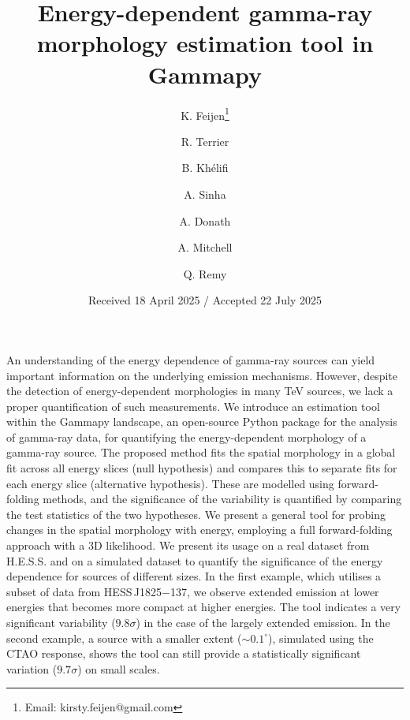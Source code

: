 \documentclass{aa}
\newcommand{\hessj}{HESS\,J1825$-$137\xspace}
\begin{document}
 

   \title{Energy-dependent gamma-ray morphology estimation tool in Gammapy}

   \author{K. Feijen\thanks{Email: kirsty.feijen@gmail.com} 
          \and R. Terrier 
          \and B. Khélifi 
          \and A. Sinha 
          \and A. Donath 
          \and A. Mitchell 
          \and Q. Remy 
          }


   \date{Received 18 April 2025 / Accepted 22 July 2025}

 
  \abstract
   {An understanding of the energy dependence of gamma-ray sources can yield important information on the underlying emission mechanisms. However, despite the detection of energy-dependent morphologies in many TeV sources, we lack a proper quantification of such measurements.}
   {We introduce an estimation tool within the Gammapy landscape, an open-source Python package for the analysis of gamma-ray data, for quantifying the energy-dependent morphology of a gamma-ray source.}
   {The proposed method  fits the spatial morphology in a global fit across all energy slices (null hypothesis) and compares this to separate fits for each energy slice (alternative hypothesis). These are modelled using forward-folding methods, and the significance of the variability is quantified by comparing the test statistics of the two hypotheses.}
   {We present a general tool for probing changes in the spatial morphology with energy, employing a full forward-folding approach with a 3D likelihood. We present its usage on a real dataset from H.E.S.S. and on a simulated dataset to quantify the significance of the energy dependence for sources of different sizes. In the first example, which utilises a subset of data from \hessj, we observe extended emission at lower energies that becomes more compact at higher energies. The tool indicates a very significant variability ($9.8\sigma$) in the case of the largely extended emission. In the second example, a source with a smaller extent ($\sim0.1^{\circ}$), simulated using the CTAO response, shows the tool can still provide a statistically significant variation ($9.7\sigma$) on small scales.}
   {}
\end{document}
